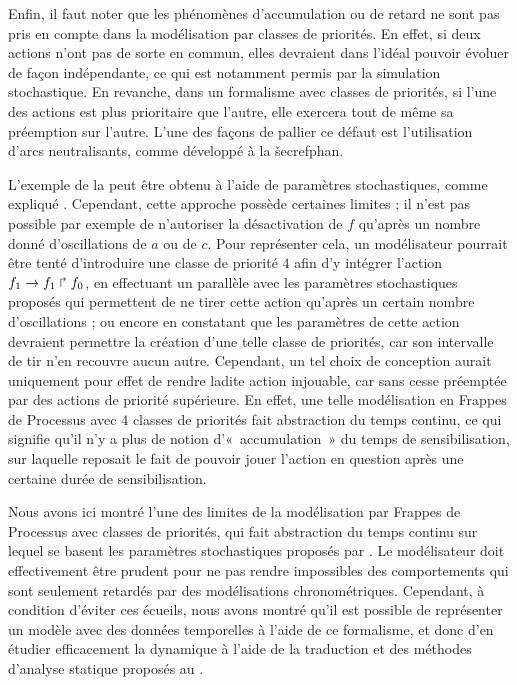 
Enfin, il faut noter que
les phénomènes d'accumulation ou de retard ne sont pas pris en compte dans la modélisation
par classes de priorités.
En effet, si deux actions n'ont pas de sorte en commun, elles devraient dans l'idéal pouvoir
évoluer de façon indépendante, ce qui est notamment permis par la simulation stochastique.
En revanche, dans un formalisme avec classes de priorités, si l'une des actions est plus
prioritaire que l'autre, elle exercera tout de même sa préemption sur l'autre.
L'une des façons de pallier ce défaut est l'utilisation d'arcs neutralisants,
comme développé à la \v secref{phan}.

\begin{example}
  L'exemple de la 
  peut être obtenu à l'aide de paramètres stochastiques,
  comme expliqué .
  Cependant, cette approche possède certaines limites ;
  il n'est pas possible par exemple de n'autoriser la désactivation de $f$
  qu'après un nombre donné d'oscillations de $a$ ou de $c$.
  Pour représenter cela, un modélisateur pourrait être tenté d'introduire une classe de
  priorité $4$ afin d'y intégrer l'action $f_1\rightarrow f_1\Rsh f_0$,
  en effectuant un parallèle avec les paramètres stochastiques proposés
  qui permettent de ne tirer cette action qu'après un certain nombre d'oscillations ;
  ou encore en constatant que les paramètres de cette action devraient permettre
  la création d'une telle classe de priorités, car son intervalle de tir n'en recouvre
  aucun autre.
  Cependant, un tel choix de conception aurait uniquement pour effet de rendre ladite action
  injouable, car sans cesse préemptée par des actions de priorité supérieure.
  En effet, une telle modélisation en Frappes de Processus avec $4$ classes de priorités
  fait abstraction du temps continu,
  ce qui signifie qu'il n'y a plus de notion d'«~accumulation~» du temps de sensibilisation,
  sur laquelle reposait le fait de pouvoir jouer l'action en question après une certaine
  durée de sensibilisation.
\end{example}

Nous avons ici montré l'une des limites de la modélisation par
Frappes de Processus avec classes de priorités, qui fait abstraction du temps
continu sur lequel se basent les paramètres stochastiques proposés par \cite{PMR10-TCSB}.
Le modélisateur doit effectivement être prudent pour ne pas rendre impossibles des
comportements qui sont seulement retardés par des modélisations chronométriques.
Cependant, à condition d'éviter ces écueils, nous avons montré qu'il est possible
de représenter un modèle avec des données temporelles à l'aide de ce formalisme,
et donc d'en étudier efficacement la dynamique à l'aide
de la traduction et des méthodes d'analyse statique proposés au .
